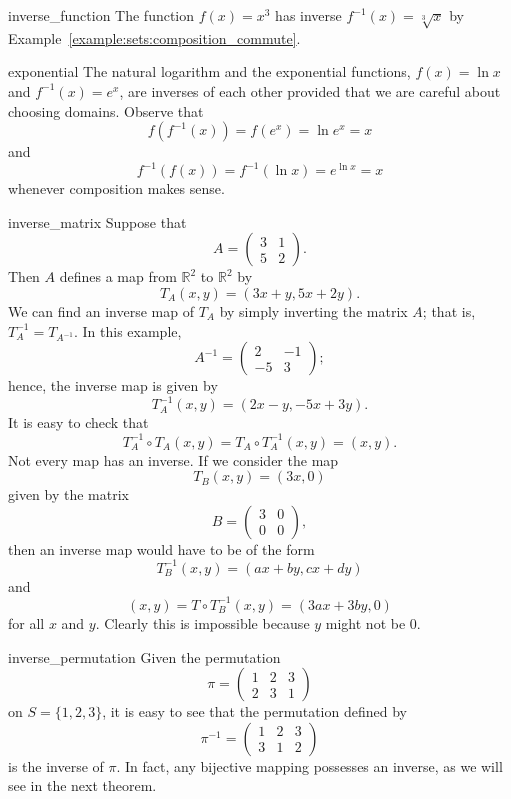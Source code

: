 \begin{example}{inverse_function}
The function $f(x) = x^3$ has inverse $f^{-1}(x) = \sqrt[3]{x}$ by Example~\ref{example:sets:composition_commute}. 
\hspace*{1in}
\end{example}

\begin{example}{exponential}
The natural logarithm and the exponential functions, $f(x) = \ln x$ and $f^{-1}(x) = e^x$, are inverses of each other provided that we are careful about choosing domains.  Observe that  
\[
f(f^{-1}(x)) = f(e^x) = \ln e^x = x
\]
and
\[
f^{-1}(f(x)) = f^{-1}(\ln x) = e^{\ln x} = x
\]
whenever composition makes sense.
\end{example}

\begin{example}{inverse_matrix}
Suppose that
\[
A =
\begin{pmatrix}
3 & 1 \\
5 & 2
\end{pmatrix}.
\]
Then $A$ defines a map from ${\mathbb R}^2$ to ${\mathbb R}^2$ by
\[
T_A (x,y) = (3x +  y, 5x +2y).
\]
We can find an inverse map of $T_A$ by simply inverting the matrix $A$; that is, $T_A^{-1} = T_{A^{-1}}$. In this example,
\[
A^{-1} =
\begin{pmatrix}
2  & -1 \\
-5 &  3
\end{pmatrix};
\]
hence, the inverse map is given by
\[
T_A^{-1} (x,y) = (2x -  y, -5x + 3y).
\]
It is easy to check that
\[
T^{-1}_A \circ T_A (x,y) = T_A \circ T_A^{-1} (x,y) = (x,y).
\]
Not every map has an inverse.  If we consider the map
\[
T_B (x,y) = (3x , 0 )
\]
given by the matrix
\[
B =
\begin{pmatrix}
3 & 0 \\
0 & 0
\end{pmatrix},
\]
then an inverse map would have to be of the form
\[
T_B^{-1} (x,y) = (ax + by, cx +dy)
\]
and
\[
(x,y) = T \circ T_B^{-1} (x,y) = (3ax + 3by, 0)
\]
for all $x$ and $y$.  Clearly this is  impossible because $y$ might not be 0. 
\end{example}

\begin{example}{inverse_permutation}
Given the permutation
\[
\pi =
\begin{pmatrix}
1 & 2 & 3 \\
2 & 3 & 1
\end{pmatrix}
\]
on $S = \{ 1,2,3 \}$, it is easy to see that the permutation defined by
\[
\pi^{-1} =
\begin{pmatrix}
1 & 2 & 3 \\
3 & 1 & 2
\end{pmatrix}
\]
is the inverse of $\pi$.  In fact, any bijective mapping possesses an inverse, as we will see in the next theorem.
\end{example}
 
